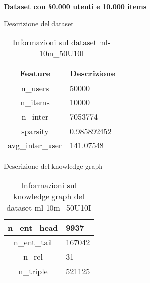 \noindent\textbf{Dataset con 50.000 utenti e 10.000 items}

\noindent Descrizione del dataset
\begin{table}[H]
    \centering
    \footnotesize
    \begin{tabularx}{\textwidth}{|c|X|}
        \hline
        \textbf{Feature} & \textbf{Descrizione} \\
        \hline
        n\_users & 50000 \\
        \hline
        n\_items & 10000 \\
        \hline
        n\_inter & 7053774 \\
        \hline
        sparsity & 0.985892452 \\
        \hline
        avg\_inter\_user & 141.07548 \\
        \hline
    \end{tabularx}
    \caption{Informazioni sul dataset ml-10m\_50U10I}
    \label{tab:dataset_info}
\end{table}


\noindent Descrizione del knowledge graph
\begin{table}[H]
    \centering
    \footnotesize
    \begin{tabularx}{\textwidth}{|c|X|}
        \hline
        n\_ent\_head & 9937 \\
        \hline
        n\_ent\_tail & 167042 \\
        \hline
        n\_rel & 31 \\
        \hline
        n\_triple & 521125 \\
        \hline
    \end{tabularx}
    \caption{Informazioni sul knowledge graph del dataset ml-10m\_50U10I}
    \label{tab:dataset_info}
\end{table}




